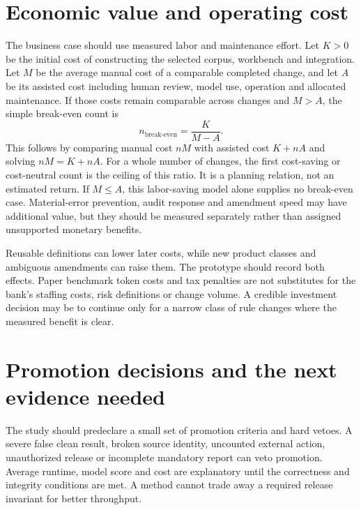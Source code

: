 \section{Economic value and operating cost}
\label{merge:P-04-prototype:06}


The business case should use measured labor and maintenance effort. Let $K>0$ be
the initial cost of constructing the selected corpus, workbench and integration.
Let $M$ be the average manual cost of a comparable completed change, and let $A$
be its assisted cost including human review, model use, operation and allocated
maintenance. If those costs remain comparable across changes and $M>A$, the
simple break-even count is
\begin{equation}
 n_{\mathrm{break\text{-}even}}=\frac{K}{M-A}.
 \label{eq:cost}
\end{equation}
This follows by comparing manual cost $nM$ with assisted cost $K+nA$ and solving
$nM=K+nA$. For a whole number of changes, the first cost-saving or
cost-neutral count is the ceiling of this ratio. It is a planning
relation, not an estimated return. If $M\leq A$, this
labor-saving model alone supplies no break-even case. Material-error prevention,
audit response and amendment speed may have additional value, but they should be
measured separately rather than assigned unsupported monetary benefits.


Reusable definitions can lower later costs, while new product classes and
ambiguous amendments can raise them. The prototype should record both effects.
Paper benchmark token costs and tax penalties are not substitutes for the bank's
staffing costs, risk definitions or change volume. A credible investment decision
may be to continue only for a narrow class of rule changes where the measured
benefit is clear.

\section{Promotion decisions and the next evidence needed}
\label{merge:M09:12}


The study should predeclare a small set of promotion criteria and hard vetoes.
A severe false clean result, broken source identity, uncounted external action,
unauthorized release or incomplete mandatory report can veto promotion. Average
runtime, model score and cost are explanatory until the correctness and integrity
conditions are met. A method cannot trade away a required release invariant for
better throughput.

